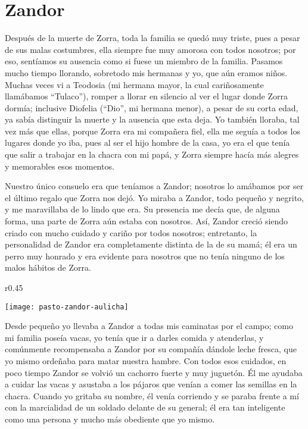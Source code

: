 \cleardoublepage
\newpage
\ifdefined\EnableIncludeImages
\fi
\chapter{Zandor}
Después de la muerte de Zorra, toda la familia se quedó muy triste, pues a pesar de sus malas costumbres, ella siempre fue muy amorosa con todos nosotros; por eso, sentíamos su ausencia como si fuese un miembro de la familia.
Pasamos mucho tiempo llorando, sobretodo mis hermanas y yo, que aún eramos niños.
Muchas veces vi a Teodosia (mi hermana mayor, la cual cariñosamente llamábamos ``Tulaco''), romper a llorar en silencio al ver el lugar donde Zorra dormía; inclusive Diofelia (``Dio'', mi hermana menor), a pesar de su corta edad, ya sabía distinguir la muerte y la ausencia que esta deja.
Yo también lloraba, tal vez más que ellas, porque Zorra era mi compañera fiel, ella me seguía a todos los lugares donde yo iba, pues al ser el hijo hombre de la casa, yo era el que tenía que salir a trabajar en la chacra con mi papá, y Zorra siempre hacía más alegres y memorables esos momentos.

Nuestro único consuelo era que teníamos a Zandor; nosotros lo amábamos por ser el último regalo que Zorra nos dejó.
Yo miraba a Zandor, todo pequeño y negrito, y me maravillaba de lo lindo que era. Su presencia me decía que, de alguna forma, una parte de Zorra aún estaba con nosotros.
Así, Zandor creció siendo criado con mucho cuidado y cariño por todos nosotros;
entretanto, la personalidad de Zandor era completamente distinta de la de su mamá; él era un perro muy honrado y era evidente para nosotros que no tenía ninguno de los malos hábitos de Zorra.
\ifdefined\EnableIncludeImages
\begin{wrapfigure}{r}{0.45\textwidth}
  \begin{center}
  \vspace{-20pt}
    \texttt{[image: pasto-zandor-aulicha]}
  \end{center}
  \vspace{-20pt}
\end{wrapfigure}
\fi
Desde pequeño yo llevaba a Zandor a todas mis caminatas por el campo; como mi familia poseía vacas, yo tenía que ir a darles comida y atenderlas, y comúnmente recompensaba a Zandor por su compañía dándole leche fresca, que yo mismo ordeñaba para matar nuestra hambre.
Con todos esos cuidados, en poco tiempo Zandor se volvió un cachorro fuerte y muy juguetón.
Él me ayudaba a cuidar las vacas y asustaba a los pájaros que venían a comer las semillas en la chacra. 
Cuando yo gritaba su nombre, él venía corriendo y se paraba frente a mí con la marcialidad de un soldado delante de su general; 
él era tan inteligente como una persona y mucho más obediente que yo mismo.

